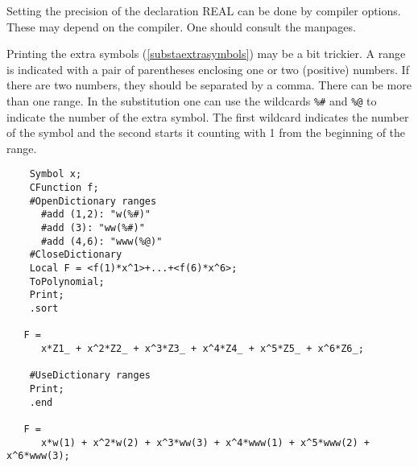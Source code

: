 Setting the precision of the declaration REAL can be done by 
compiler options. These may depend on the compiler. One should consult the 
manpages.

Printing the extra symbols (\ref{substaextrasymbols}) 
may be a bit trickier. A range is indicated with 
a pair of parentheses enclosing one or two (positive) numbers. If there are 
two numbers, they should be separated by a comma. There can be more than 
one range. In the substitution one can use the wildcards \verb:%#: and 
\verb:%@: to indicate the number of the extra symbol. The first 
wildcard indicates the number of the symbol and the second starts it 
counting with 1 from the beginning of the range.
\begin{verbatim}
    Symbol x;
    CFunction f;
    #OpenDictionary ranges
      #add (1,2): "w(%#)"
      #add (3): "ww(%#)"
      #add (4,6): "www(%@)"
    #CloseDictionary
    Local F = <f(1)*x^1>+...+<f(6)*x^6>;
    ToPolynomial;
    Print;
    .sort

   F =
      x*Z1_ + x^2*Z2_ + x^3*Z3_ + x^4*Z4_ + x^5*Z5_ + x^6*Z6_;

    #UseDictionary ranges
    Print;
    .end

   F =
      x*w(1) + x^2*w(2) + x^3*ww(3) + x^4*www(1) + x^5*www(2) + x^6*www(3);
\end{verbatim}


